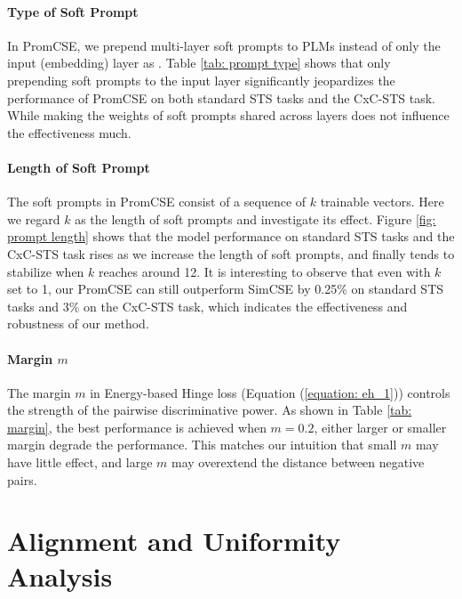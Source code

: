 \documentclass[11pt]{article}
\begin{document}
\paragraph{Type of Soft Prompt}
In PromCSE, we prepend multi-layer soft prompts to PLMs instead of only the input (embedding) layer as \cite{Lester21sacle}. Table \ref{tab: prompt type} shows that only prepending soft prompts to the input layer significantly jeopardizes the performance of PromCSE on both standard STS tasks and the CxC-STS task. While making the weights of soft prompts shared across layers does not influence the effectiveness much.

\paragraph{Length of Soft Prompt}
The soft prompts in PromCSE consist of a sequence of $k$ trainable vectors. Here we regard $k$ as the length of soft prompts and investigate its effect.
Figure \ref{fig: prompt length} shows that the model performance on standard STS tasks and the CxC-STS task rises as we increase the length of soft prompts, and finally tends to stabilize when $k$ reaches around 12.
It is interesting to observe that even with $k$ set to 1, our PromCSE can still outperform SimCSE by 0.25\% on standard STS tasks and 3\% on the CxC-STS task, which indicates the effectiveness and robustness of our method. 

\paragraph{Margin $m$}
The margin $m$ in Energy-based Hinge loss (Equation (\ref{equation: eh_1})) controls the strength of the pairwise discriminative power. As shown in Table \ref{tab: margin}, the best performance is achieved when $m = 0.2$, either larger or smaller margin degrade the performance.
This matches our intuition that small $m$ may have little effect, and large $m$ may overextend the distance between negative pairs.

\section{Alignment and Uniformity Analysis}
\end{document}
